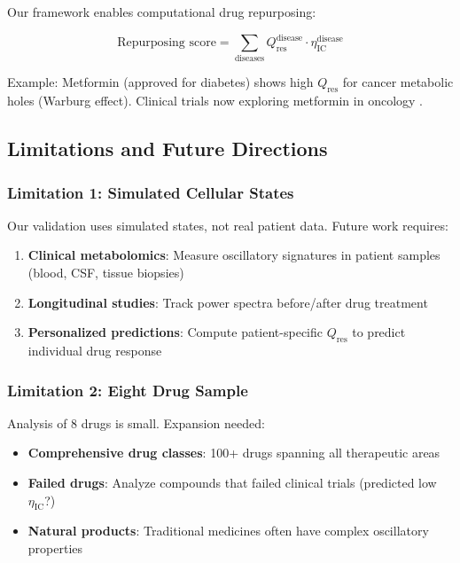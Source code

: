 \documentclass{article}
\begin{document}
Our framework enables computational drug repurposing:

\begin{equation}
\text{Repurposing score} = \sum_{\text{diseases}} Q_{\text{res}}^{\text{disease}} \cdot \eta_{\text{IC}}^{\text{disease}}
\end{equation}

Example: Metformin (approved for diabetes) shows high $Q_{\text{res}}$ for cancer metabolic holes (Warburg effect). Clinical trials now exploring metformin in oncology \citep{Pollak2017}.

\subsection{Limitations and Future Directions}

\subsubsection{Limitation 1: Simulated Cellular States}

Our validation uses simulated states, not real patient data. Future work requires:

\begin{enumerate}
    \item \textbf{Clinical metabolomics}: Measure oscillatory signatures in patient samples (blood, CSF, tissue biopsies)
    \item \textbf{Longitudinal studies}: Track power spectra before/after drug treatment
    \item \textbf{Personalized predictions}: Compute patient-specific $Q_{\text{res}}$ to predict individual drug response
\end{enumerate}

\subsubsection{Limitation 2: Eight Drug Sample}

Analysis of 8 drugs is small. Expansion needed:

\begin{itemize}
    \item \textbf{Comprehensive drug classes}: 100+ drugs spanning all therapeutic areas
    \item \textbf{Failed drugs}: Analyze compounds that failed clinical trials (predicted low $\eta_{\text{IC}}$?)
    \item \textbf{Natural products}: Traditional medicines often have complex oscillatory properties
\end{itemize}
\end{document}

